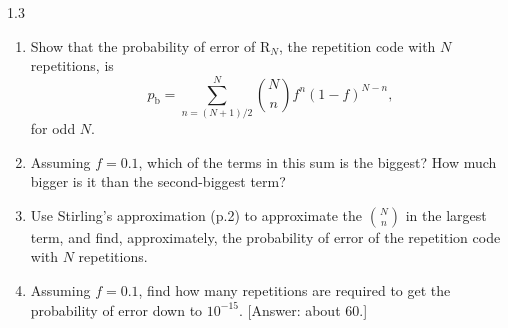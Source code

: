 \documentclass[12pt, a4paper]{article}
\begin{document}
\begin{prob}{1.3}
\begin{enumerate}
    \item[(a)] Show that the probability of error of $\mathrm{R}_N$, the repetition code with $N$ repetitions, is
    \begin{equation}
        p_{\mathrm{b}} = \sum_{n=(N+1)/2}^{N} \binom{N}{n} f^n (1-f)^{N-n}, \tag{1.24}
    \end{equation}
    for odd $N$.
    
    \item[(b)] Assuming $f = 0.1$, which of the terms in this sum is the biggest? How much bigger is it than the second-biggest term?
    
    \item[(c)] Use Stirling's approximation (p.2) to approximate the $\binom{N}{n}$ in the largest term, and find, approximately, the probability of error of the repetition code with $N$ repetitions.
    
    \item[(d)] Assuming $f = 0.1$, find how many repetitions are required to get the probability of error down to $10^{-15}$. [Answer: about 60.]
\end{enumerate}
\end{prob}
\end{document}
